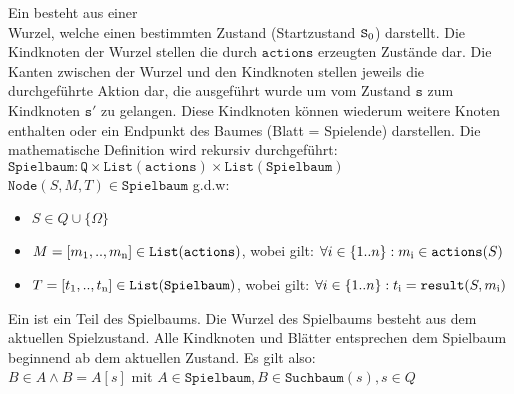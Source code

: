 \begin{Definition}
Ein  besteht aus einer \\Wurzel, welche einen bestimmten Zustand (Startzustand $\mathtt{S\textsubscript{0}}$) darstellt. Die Kindknoten der Wurzel stellen die durch $\mathtt{actions}$ erzeugten Zustände dar. Die Kanten zwischen der Wurzel und den Kindknoten stellen jeweils die durchgeführte Aktion dar, die ausgeführt wurde um vom Zustand $\mathtt{s}$ zum Kindknoten $\mathtt{s'}$ zu gelangen. Diese Kindknoten können wiederum weitere Knoten enthalten oder ein Endpunkt des Baumes (Blatt = Spielende)  darstellen.
Die mathematische Definition wird rekursiv durchgeführt:
\\$\mathtt{Spielbaum}: \mathtt{Q} \times \mathtt{List(actions)} \times \mathtt{List(Spielbaum)}$
\\$\mathtt{Node}(S,M,T) \in \mathtt{Spielbaum}$ g.d.w:
\begin{itemize}
\item $S \in Q \cup \{\Omega\}$
\item $M = [m\textsubscript{1}, .. , m \textsubscript{n}] \in \mathtt{List(actions)}$, wobei gilt:  $\forall i \in \{1 .. n\}: m\textsubscript{i} \in \mathtt{actions}(S) $
\item $T = [t\textsubscript{1}, .. , t \textsubscript{n}] \in \mathtt{List(Spielbaum)}$, wobei gilt: $ \forall i \in \{1 .. n\}: t\textsubscript{i} = \mathtt{result}(S, m\textsubscript{i}) $
\end{itemize}
\end{Definition}
\begin{Definition}
Ein  ist ein Teil des Spielbaums. Die Wurzel des Spielbaums besteht aus dem aktuellen Spielzustand. Alle Kindknoten und Blätter entsprechen dem Spielbaum beginnend ab dem aktuellen Zustand. Es gilt also:
\\ $B \in A \wedge B = A[s]$ mit $ A \in \mathtt{Spielbaum}, B \in \mathtt{Suchbaum}(s), s \in Q$
\end{Definition}
\newpage
